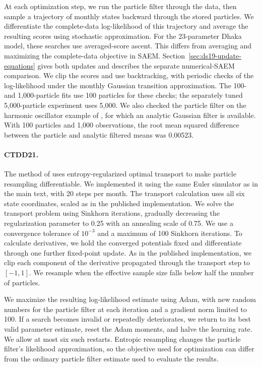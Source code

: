 \documentclass[11pt]{article}
\theoremstyle{thmstylethree}%
\begin{document}
At each optimization step, we run the particle filter through the data,
then sample a trajectory of monthly states backward through the stored
particles. We differentiate the complete-data log-likelihood of this
trajectory and average the resulting scores using stochastic approximation.
For the 23-parameter Dhaka model, these searches use averaged-score ascent.
This differs from averaging and maximizing the complete-data objective in
SAEM. Section~\ref{sec:ds19-update-equations} gives both updates and describes
the separate numerical-SAEM comparison. We clip the scores and use
backtracking, with periodic checks of the log-likelihood under the monthly
Gaussian transition approximation. The 100- and 1,000-particle fits use
100 particles for these checks; the separately tuned 5,000-particle
experiment uses 5,000.
We also checked the particle filter on the harmonic oscillator example of
\citet{ditlevsen19}, for which an analytic Gaussian filter is available.
With 100 particles and 1,000 observations, the root mean squared difference
between the particle and analytic filtered means was 0.00523.

\paragraph{CTDD21.}
The method of \citet{corenflos21} uses entropy-regularized optimal transport
to make particle resampling differentiable. We implemented it using the
same Euler simulator as in the main text, with 20 steps per month.
The transport calculation uses all six state coordinates, scaled as in
the published implementation. We solve the transport problem using
Sinkhorn iterations, gradually decreasing the regularization parameter
to 0.25 with an annealing scale of 0.75. We use a convergence tolerance
of $10^{-3}$ and a maximum of 100 Sinkhorn iterations. To calculate
derivatives, we hold the converged potentials fixed and differentiate
through one further fixed-point update. As in the published implementation,
we clip each component of the derivative propagated through the transport
step to $[-1,1]$. We resample when the effective sample size falls below
half the number of particles.

We maximize the resulting log-likelihood estimate using Adam, with new
random numbers for the particle filter at each iteration and a gradient
norm limited to 100. If a search becomes invalid or repeatedly deteriorates,
we return to its best valid parameter estimate, reset the Adam moments,
and halve the learning rate. We allow at most six such restarts.
Entropic resampling changes the particle filter's likelihood approximation,
so the objective used for optimization can differ from the ordinary
particle filter estimate used to evaluate the results.
\end{document}
